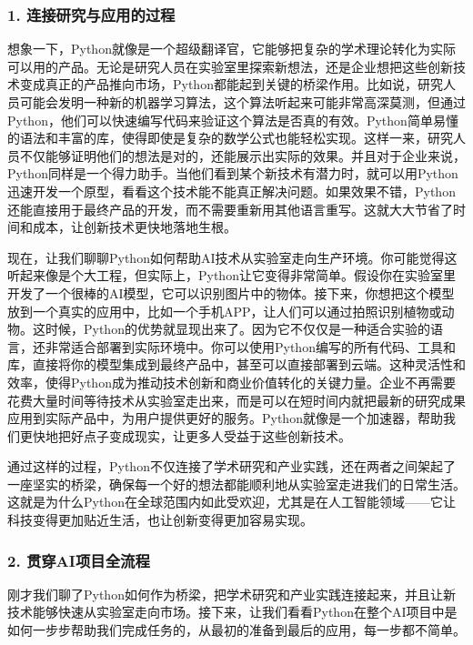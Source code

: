 \subsubsection{1. 连接研究与应用的过程}
    
想象一下，Python就像是一个超级翻译官，它能够把复杂的学术理论转化为实际可以用的产品。无论是研究人员在实验室里探索新想法，还是企业想把这些创新技术变成真正的产品推向市场，Python都能起到关键的桥梁作用。比如说，研究人员可能会发明一种新的机器学习算法，这个算法听起来可能非常高深莫测，但通过Python，他们可以快速编写代码来验证这个算法是否真的有效。Python简单易懂的语法和丰富的库，使得即使是复杂的数学公式也能轻松实现。这样一来，研究人员不仅能够证明他们的想法是对的，还能展示出实际的效果。并且对于企业来说，Python同样是一个得力助手。当他们看到某个新技术有潜力时，就可以用Python迅速开发一个原型，看看这个技术能不能真正解决问题。如果效果不错，Python还能直接用于最终产品的开发，而不需要重新用其他语言重写。这就大大节省了时间和成本，让创新技术更快地落地生根。

现在，让我们聊聊Python如何帮助AI技术从实验室走向生产环境。你可能觉得这听起来像是个大工程，但实际上，Python让它变得非常简单。假设你在实验室里开发了一个很棒的AI模型，它可以识别图片中的物体。接下来，你想把这个模型放到一个真实的应用中，比如一个手机APP，让人们可以通过拍照识别植物或动物。这时候，Python的优势就显现出来了。因为它不仅仅是一种适合实验的语言，还非常适合部署到实际环境中。你可以使用Python编写的所有代码、工具和库，直接将你的模型集成到最终产品中，甚至可以直接部署到云端。这种灵活性和效率，使得Python成为推动技术创新和商业价值转化的关键力量。企业不再需要花费大量时间等待技术从实验室走出来，而是可以在短时间内就把最新的研究成果应用到实际产品中，为用户提供更好的服务。Python就像是一个加速器，帮助我们更快地把好点子变成现实，让更多人受益于这些创新技术。

通过这样的过程，Python不仅连接了学术研究和产业实践，还在两者之间架起了一座坚实的桥梁，确保每一个好的想法都能顺利地从实验室走进我们的日常生活。这就是为什么Python在全球范围内如此受欢迎，尤其是在人工智能领域——它让科技变得更加贴近生活，也让创新变得更加容易实现。

\subsubsection{2. 贯穿AI项目全流程}

刚才我们聊了Python如何作为桥梁，把学术研究和产业实践连接起来，并且让新技术能够快速从实验室走向市场。接下来，让我们看看Python在整个AI项目中是如何一步步帮助我们完成任务的，从最初的准备到最后的应用，每一步都不简单。

